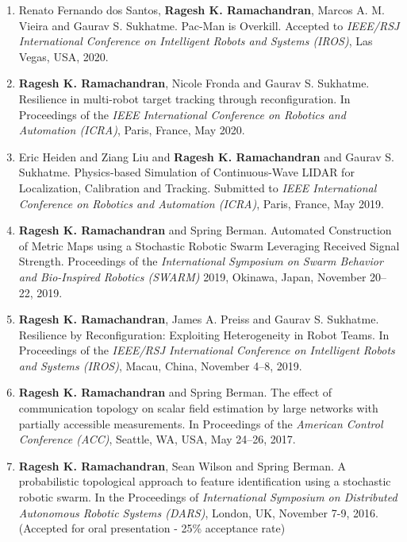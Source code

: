 \documentclass[margin,line]{res}
\begin{document}
\begin{resume}
\begin{enumerate}
	\item Renato Fernando dos Santos, \textbf{Ragesh K. Ramachandran}, Marcos A. M. Vieira and Gaurav S. Sukhatme. Pac-Man is Overkill. Accepted to \textit{ IEEE/RSJ International Conference on Intelligent Robots and Systems (IROS)}, Las Vegas, USA, 2020.	
	
	\item \textbf{Ragesh K. Ramachandran}, Nicole Fronda and Gaurav S. Sukhatme. Resilience in multi-robot target tracking through reconfiguration. In Proceedings of the \textit{ IEEE International Conference on Robotics and Automation (ICRA)}, Paris, France, May  2020.
	
	\item Eric Heiden and Ziang Liu and \textbf{Ragesh K. Ramachandran} and Gaurav S. Sukhatme. Physics-based  Simulation  of  Continuous-Wave  LIDAR
	for  Localization,  Calibration  and  Tracking. Submitted to \textit{ IEEE International Conference on Robotics and Automation (ICRA)}, Paris, France, May   2019.
	
	\item \textbf{Ragesh K. Ramachandran} and Spring Berman. Automated Construction of Metric Maps using a Stochastic Robotic Swarm Leveraging Received Signal Strength. Proceedings of the \textit{International Symposium on Swarm Behavior and Bio-Inspired Robotics (SWARM)} 2019, Okinawa, Japan, November 20–22, 2019.
	
	\item \textbf{Ragesh K. Ramachandran}, James A. Preiss and Gaurav S. Sukhatme. Resilience by Reconfiguration: Exploiting Heterogeneity in Robot Teams. In Proceedings of the \textit{ IEEE/RSJ International Conference on Intelligent Robots and Systems (IROS)}, Macau, China, November 4–8, 2019.
	
	\item \textbf{Ragesh K. Ramachandran} and Spring Berman. The effect of communication topology on scalar field estimation by large networks with partially accessible measurements. In Proceedings of the \textit{ American Control Conference (ACC)}, Seattle, WA, USA, May 24–26, 2017.
	
	\item \textbf{Ragesh K. Ramachandran},  Sean Wilson and Spring Berman. A probabilistic topological approach to feature identification using a stochastic robotic swarm. In the Proceedings of \textit{International Symposium on Distributed Autonomous Robotic Systems (DARS)}, London, UK, November 7-9, 2016. (Accepted for oral presentation - 25\% acceptance rate)
	

\end{enumerate}
\end{resume}
\end{document}
